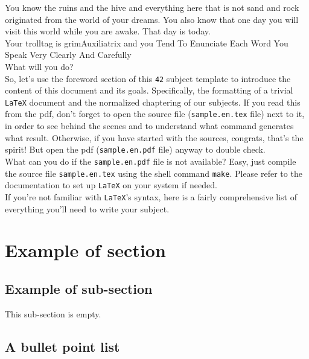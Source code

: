 \documentclass{42-en}
\begin{document}
    You know the ruins and the hive and everything here that is not sand and rock originated from the world of your dreams.
    You also know that one day you will visit this world while you are awake. That day is today.\\

    Your trolltag is grimAuxiliatrix and you Tend To Enunciate Each Word You Speak Very Clearly And Carefully\\

    What will you do?\\

    So, let's use the foreword section of this \texttt{42} subject
    template to introduce the content of this document and
    its goals.
    Specifically, the formatting of a trivial
    \texttt{LaTeX} document and the normalized chaptering of our
    subjects. If you read this from the pdf, don't forget to open the
    source file (\texttt{sample.en.tex} file) next to it, in
    order to see behind the scenes and to understand what command
    generates what result. Otherwise, if you have started with the
    sources, congrats, that's the spirit! But open the pdf
    (\texttt{sample.en.pdf} file) anyway to double check.\\

    What can you do if the \texttt{sample.en.pdf} file is not available?
    Easy, just compile the source file \texttt{sample.en.tex} using
    the shell command \texttt{make}. Please refer to the documentation
    to set up \texttt{LaTeX} on your system if needed.\\

    If you're not familiar with \texttt{LaTeX}'s syntax, here is a
    fairly comprehensive list of everything you'll need to write your
    subject.\\


    \section{Example of section}


        \subsection{Example of sub-section}

           This sub-section is empty.


        \newpage


        \subsection{A bullet point list}
\end{document}
